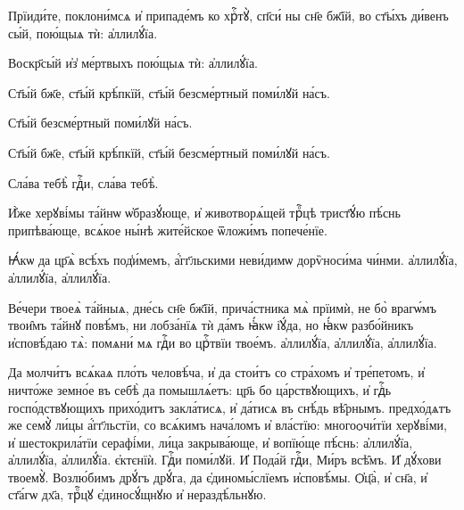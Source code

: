 
\hKv Прїиди́те, поклони́мсѧ и҆ припаде́мъ ко хрⷭ҇тꙋ̀,  
сп҃си́ ны сн҃е бж҃їй, во ст҃ы́хъ ди́венъ сы́й,  пою́щыѧ тѝ: а҆ллилꙋ́їа. 
%

\hKv Воскр҃сы́й и҆з̾ ме́ртвыхъ пою́щыѧ  тѝ: а҆ллилꙋ́їа. 



\hKv Ст҃ы́й бж҃е, ст҃ы́й крѣ́пкїй, ст҃ы́й безсме́ртный поми́лꙋй  на́съ. 
%

\hKv Ст҃ы́й безсме́ртный поми́лꙋй на́съ. 


\hKv Ст҃ы́й бж҃е, ст҃ы́й крѣ́пкїй, ст҃ы́й безсме́ртный поми́лꙋй  на́съ. 


\hKv Сла́ва тебѣ̀ гдⷭ҇и, сла́ва тебѣ̀. 


\hKv И҆̀же херꙋві́мы та́йнѡ ѡ҆бразꙋ́юще, и҆ животворѧ́щей трⷪ҇цѣ  трист҃ꙋ́ю пѣ́снь припѣва́юще, всѧ́кое ны́нѣ жите́йское  ѿложи́мъ попече́нїе. 

\hKv Ꙗ҆́кѡ да цр҃ѧ̀ всѣ́хъ под̾и́мемъ, а҆́гг҃льскими неви́димѡ  дорѷноси́ма чи́нми. а҆ллилꙋ́їа, а҆ллилꙋ́їа, а҆ллилꙋ́їа. 


\hKv Ве́чери твоеѧ̀ та́йныѧ, дне́сь сн҃е бж҃їй, прича́стника мѧ̀  прїимѝ, не бо̀ врагѡ́мъ твои̑мъ та́йнꙋ повѣ́мъ, ни  лобза́нїѧ тѝ да́мъ ꙗ҆́кѡ і҆ꙋ́да, но ꙗ҆́кѡ разбо́йникъ  и҆сповѣ́даю тѧ̀: помѧни́ мѧ гдⷭ҇и во  црⷭ҇твїи твое́мъ. а҆ллилꙋ́їа, а҆ллилꙋ́їа, а҆ллилꙋ́їа. 


\hKv Да молчи́тъ всѧ́каѧ пло́ть человѣ́ча, и҆ да стои́тъ со  стра́хомъ и҆ тре́петомъ, и҆ ничто́же земно́е въ себѣ̀ да  помышлѧ́етъ: цр҃ь бо ца́рствꙋющихъ, и҆ гдⷭ҇ь  госпо́дствꙋющихъ прихо́дитъ закла́тисѧ, и҆ да́тисѧ въ  снѣ́дь вѣ̑рнымъ. предхо́дѧтъ же семꙋ̀ ли́цы а҆́гг҃льстїи,  со всѧ́кимъ нача́ломъ и҆ вла́стїю: многоѻчи́тїи херꙋві́ми,  и҆ шестокрила́тїи серафі́ми, ли́ца закрыва́юще, и҆ вопїю́ще  пѣ́снь: а҆ллилꙋ́їа, а҆ллилꙋ́їа, а҆ллилꙋ́їа. 
%
 є҆ктєнїѝ.  Гдⷭ҇и поми́лꙋй. \hKv И҆ Пода́й  гдⷭ҇и,   
%
 Ми́ръ всѣ̑мъ.  И҆  дꙋ́хови твоемꙋ̀.  Возлю́бимъ дрꙋ́гъ дрꙋ́га, да  є҆диномы́слїемъ и҆сповѣ́мы.
 Ѻ҆ц҃а̀, и҆ сн҃а, и҆  ст҃а́гѡ дх҃а, трⷪ҇цꙋ є҆диносꙋ́щнꙋю и҆ нераздѣ́льнꙋю.  
%


